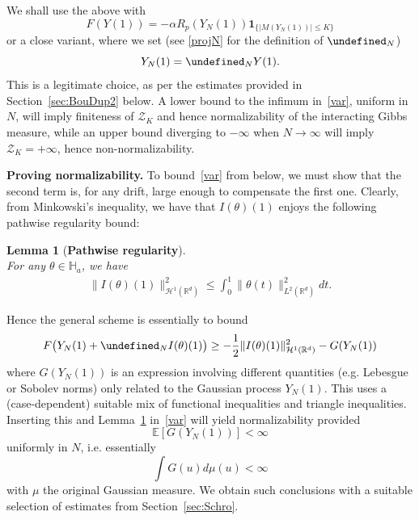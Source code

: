 \documentclass[%
11pt,  reqno]{amsart}
\newtheorem{lemma}[theorem]{Lemma}
\theoremstyle{remarkstyle}
\newcommand{\1}{\hspace{0.2mm}\text{I}\hspace{0.2mm}}
\newcommand{\R}{\mathbb{R}}
\let\P= \undefined
\newcommand{\P}{\mathbf{P}}
\newcommand{\E}{\mathbb{E}}
\newcommand{\al}{\alpha}
\newcommand{\ind}{\mathbf 1}
\numberwithin{equation}{section}
\numberwithin{theorem}{section}
\newcommand{\cZ}{\mathcal{Z}}
\begin{document}
	We shall use the above with 
	\begin{equation}\label{eq:usevar}
		F(Y(1)) = -\al R_p(Y_N(1)) \ind_{\{|M(Y_N(1))|\leq K\}} 
	\end{equation}
	or a close variant, where we set (see \eqref{projN} for the definition of $\P_N$) 
	\begin{equation} \label{eq:YN}
		Y_N (1)= \P_{N} Y (1).
	\end{equation}
	This is a legitimate choice, as per the estimates provided in Section~\ref{sec:BouDup2} below. A lower bound to the infimum in~\eqref{var}, uniform in $N$, will imply finiteness of $\cZ_K$ and hence normalizability of the interacting Gibbs measure, while an upper bound diverging to $-\infty$ when $N\to \infty$ will imply $\cZ_K = +\infty$, hence non-normalizability.
	
	\bigskip
	
	\noindent \textbf{Proving normalizability.} To bound~\eqref{var} from below, we must show that the second term is, for any drift, large enough to compensate the first one. Clearly, from Minkowski's inequality, we have that $I(\theta)(1)$ enjoys 
	the following pathwise regularity bound:
	
	\begin{lemma}[\bf Pathwise regularity] 
		\label{LEM:bounds} \mbox{} \\
		For any $\theta \in \mathbb{H}_a$,
		we have
		\begin{align}
			\label{I}
			\| I (\theta) (1)\|^2_{\mathcal H^1 (\R^d)} \le \int_0^1 \| \theta (t) \|_{L^2(\R^d)}^2 dt.
		\end{align}
	\end{lemma}
	
	Hence the general scheme is essentially to bound 
	\[
	F\big(Y_N(1) + \P_{N}I(\theta) (1) \big) \geq - \frac{1}{2} \| I (\theta) (1)\|^2_{\mathcal H^1 (\R^d)} - G (Y_N(1))
	\]
	where $G (Y_N(1))$ is an expression involving different quantities (e.g. Lebesgue or Sobolev norms) only related to the Gaussian process $Y_N(1)$. This uses a (case-dependent) suitable mix of functional inequalities and triangle inequalities. Inserting this and Lemma~\ref{LEM:bounds} in~\eqref{var} will yield normalizability provided 
	\[
	\E \left[ G (Y_N(1)) \right] < \infty 
	\]
	uniformly in $N$, i.e. essentially 
	\[
	\int  G (u) d\mu (u) < \infty
	\]
	with $\mu$ the original Gaussian measure. We obtain such conclusions with a suitable selection of estimates from Section~\ref{sec:Schro}.
	
	
	\bigskip
	
\end{document}
